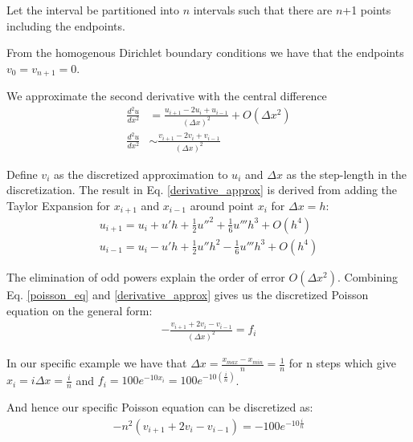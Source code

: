 Let the interval be partitioned into $n$ intervals such that there are $n$+1 points including the endpoints. 

From the homogenous Dirichlet boundary conditions we have that the endpoints $v_0 = v_{n+1} = 0$.

We approximate the second derivative with the central difference
\begin{align}
    \frac{d^2u}{dx^2}  &= \frac{u_{i+1} - 2u_{i} + u_{i-1}}{(\Delta x)^2} + O(\Delta x^2)  \\
    \frac{d^2u}{dx^2} &\sim \frac{v_{i+1} - 2v_{i} + v_{i-1}}{(\Delta x)^2}
    \label{derivative_approx}
\end{align}

Define $v_i$ as the discretized approximation to $u_i$ and $\Delta x$ as the step-length in the discretization. The result in Eq. \ref{derivative_approx} is derived from adding the Taylor Expansion for $x_{i+1} $ and $x_{i-1}$ around point $x_i$ for $\Delta x = h$: 
\begin{align*}
    u_{i+1} = u_i + u'h + \frac{1}{2}u''^2 + \frac{1}{6}u'''h^3 + O(h^4)\\
    u_{i-1} = u_i - u'h + \frac{1}{2}u''h^2 - \frac{1}{6}u'''h^3 + O(h^4) 
\end{align*}

The elimination of odd powers explain the order of error $O(\Delta x^2)$. Combining Eq. \ref{poisson_eq} and \ref{derivative_approx} gives us the discretized Poisson equation on the general form:
\begin{align}
    - \frac{v_{i+1} + 2v_{i} - v_{i-1}}{(\Delta x)^2} =  f_i
\end{align}

In our specific example we have that $\Delta x = \frac{x_{max} - x_{min}}{n} = \frac{1}{n}$ for n steps which give $x_i = i \Delta x = \frac{i}{n}$ and $f_i = 100e^{-10x_i} = 100e^{-10(\frac{i}{n})}$. 

And hence our specific Poisson equation can be discretized as:
\begin{align}
    - n^2(v_{i+1} + 2v_{i} - v_{i-1}) = -100e^{-10\frac{i}{n}}
    \label{discretization}
\end{align}


